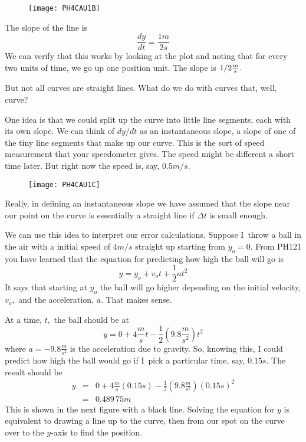 \begin{figure}[h!]
	\centering
    \texttt{[image: PH4CAU1B]}
\end{figure}

The slope of the line is 
\begin{equation*}
\frac{dy}{dt}=\frac{1\unit{m}}{2\unit{s}}
\end{equation*}%
We can verify that this works by looking at the plot and noting that for
every two units of time, we go up one position unit. The slope is $1/2\frac{%
\unit{m}}{\unit{s}}.$

But not all curves are straight lines. What do we do with curves that, well,
curve?

One idea is that we could split up the curve into little line segments, each
with its own slope. We can think of $dy/dt$ as an instantaneous slope, a
slope of one of the tiny line segments that make up our curve. This is the
sort of speed measurement that your speedometer gives. The speed might be
different a short time later. But right now the speed is, say, $0.5\unit{m}/%
\unit{s}.$

\begin{figure}[h!]
	\centering
    \texttt{[image: PH4CAU1C]}
\end{figure}

Really, in defining an
instantaneous slope we have assumed that the slope near our point on the
curve is essentially a straight line if $\Delta t$ is small enough.

We can use this idea to interpret our error calculations. Suppose I\ throw a
ball in the air with a initial speed of $4\unit{m}/\unit{s}$ straight up
starting from $y_{o}=0$. From PH121 you have learned that the equation for
predicting how high the ball will go is 
\begin{equation*}
y=y_{o}+v_{o}t+\frac{1}{2}at^{2}
\end{equation*}%
It says that starting at $y_{o}$ the ball will go higher depending on the
initial velocity, $v_{o},$ and the acceleration, $a.$ That makes sense.

At a time, $t,$ the ball should be at 
\begin{equation*}
y=0+4\frac{\unit{m}}{\unit{s}}t-\frac{1}{2}\left( 9.8\frac{\unit{m}}{\unit{s}%
^{2}}\right) t^{2}
\end{equation*}%
where $a=-9.8\frac{\unit{m}}{\unit{s}^{2}}$ is the acceleration due to
gravity. So, knowing this, I could predict how high the ball would go if I\
pick a particular time, say, $0.15\unit{s}.$ The result should be%
\begin{eqnarray*}
y &=&0+4\frac{\unit{m}}{\unit{s}}\left( 0.15\unit{s}\right) -\frac{1}{2}%
\left( 9.8\frac{\unit{m}}{\unit{s}^{2}}\right) \left( 0.15\unit{s}\right)
^{2} \\
&=&0.489\,75\unit{m}
\end{eqnarray*}%
This is shown in the next figure with a black line. Solving the equation for 
$y$ is equivalent to drawing a line up to the curve, then from our spot on
the curve over to the $y$-axis to find the position.

